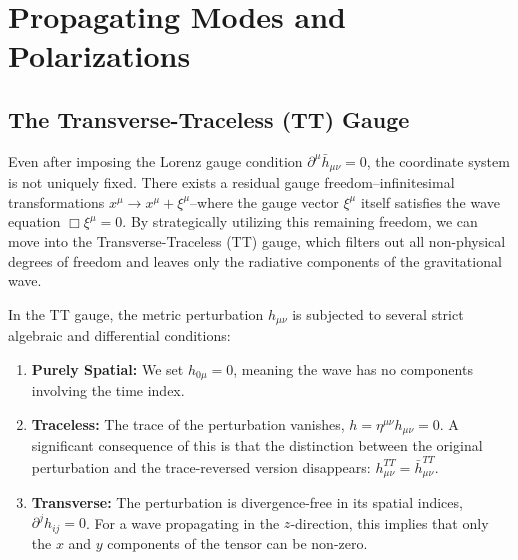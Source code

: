 \section{Propagating Modes and Polarizations}
\label{sec:propagating_modes_and_polarizations}

\subsection{The Transverse-Traceless (TT) Gauge} Even after imposing the Lorenz gauge condition $\partial^{\mu}\bar{h}_{\mu\nu} = 0$, the coordinate system is not uniquely fixed. There exists a residual gauge freedom--infinitesimal transformations $x^{\mu} \to x^{\mu} + \xi^{\mu}$--where the gauge vector $\xi^{\mu}$ itself satisfies the wave equation $\Box \xi^{\mu} = 0$. By strategically utilizing this remaining freedom, we can move into the Transverse-Traceless (TT) gauge, which filters out all non-physical degrees of freedom and leaves only the radiative components of the gravitational wave.

In the TT gauge, the metric perturbation $h_{\mu\nu}$ is subjected to several strict algebraic and differential conditions:
\begin{enumerate}
  \item \textbf{Purely Spatial:} We set $h_{0\mu} = 0$, meaning the wave has no components involving the time index.
  \item \textbf{Traceless:} The trace of the perturbation vanishes, $h = \eta^{\mu\nu}h_{\mu\nu} = 0$. A significant consequence of this is that the distinction between the original perturbation and the trace-reversed version disappears: $h^{TT}_{\mu\nu} = \bar{h}^{TT}_{\mu\nu}$.
  \item \textbf{Transverse:} The perturbation is divergence-free in its spatial indices, $\partial^{j}h_{ij} = 0$. For a wave propagating in the $z$-direction, this implies that only the $x$ and $y$ components of the tensor can be non-zero.
\end{enumerate}

